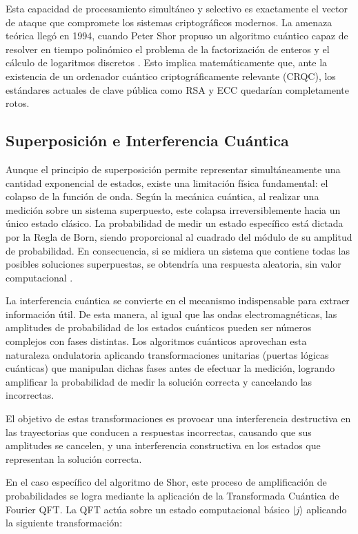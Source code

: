 \documentclass[11pt, a4paper]{report}
\theoremstyle{definition}
\begin{document}
Esta capacidad de procesamiento simultáneo y selectivo es exactamente el vector de ataque que compromete los sistemas criptográficos modernos. La amenaza teórica llegó en 1994, cuando Peter Shor propuso un algoritmo cuántico capaz de resolver en tiempo polinómico el problema de la factorización de enteros y el cálculo de logaritmos discretos \cite{shor1994}. Esto implica matemáticamente que, ante la existencia de un ordenador cuántico criptográficamente relevante (CRQC), los estándares actuales de clave pública como RSA y ECC quedarían completamente rotos.

\subsection{Superposición e Interferencia Cuántica}

Aunque el principio de superposición permite representar simultáneamente una cantidad exponencial de estados, existe una limitación física fundamental: el colapso de la función de onda. Según la mecánica cuántica, al realizar una medición sobre un sistema superpuesto, este colapsa irreversiblemente hacia un único estado clásico. La probabilidad de medir un estado específico está dictada por la Regla de Born, siendo proporcional al cuadrado del módulo de su amplitud de probabilidad. En consecuencia, si se midiera un sistema que contiene todas las posibles soluciones superpuestas, se obtendría una respuesta aleatoria, sin valor computacional \cite{nielsen2010}.

La interferencia cuántica se convierte en el mecanismo indispensable para extraer información útil. De esta manera, al igual que las ondas electromagnéticas, las amplitudes de probabilidad de los estados cuánticos pueden ser números complejos con fases distintas. Los algoritmos cuánticos aprovechan esta naturaleza ondulatoria aplicando transformaciones unitarias (puertas lógicas cuánticas) que manipulan dichas fases antes de efectuar la medición, logrando amplificar la probabilidad de medir la solución correcta y cancelando las incorrectas.

El objetivo de estas transformaciones es provocar una interferencia destructiva en las trayectorias que conducen a respuestas incorrectas, causando que sus amplitudes se cancelen, y una interferencia constructiva en los estados que representan la solución correcta. 

En el caso específico del algoritmo de Shor, este proceso de amplificación de probabilidades se logra mediante la aplicación de la Transformada Cuántica de Fourier QFT\cite{nielsen2010}. La QFT actúa sobre un estado computacional básico $|j\rangle$ aplicando la siguiente transformación:
\end{document}
